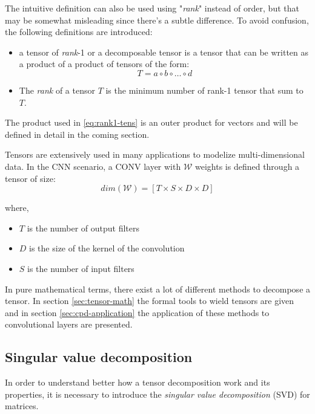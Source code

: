 The intuitive definition can also be used using "\emph{rank}" instead of order, but that may be somewhat misleading since there's a subtle difference. To avoid confusion, the following definitions are introduced: 
\begin{itemize}
  \item a tensor of \emph{rank}-1 or a decomposable tensor  is a tensor that can be written as a product of a product of tensors of the form: 
  \begin{equation}
  \label{eq:rank1-tens}
    T = a \circ b \circ \ldots \circ d  
  \end{equation}   
  
  \item The \emph{rank} of a tensor $T$ is the minimum number of rank-1 tensor that sum to $T$.

\end{itemize}

The product used in \ref{eq:rank1-tens} is an outer product for vectors and will be defined in detail in the coming section. 

Tensors are extensively used in many applications \parencite{WTensor} to modelize multi-dimensional data. In the CNN scenario, a CONV layer with $\mathcal{W}$ weights is defined through a tensor of size: 
\begin{equation}
\label{eq:conv-tensor}
  dim(\mathcal{W})  = [T \times S \times D \times D]
\end{equation}

where, 
\begin{itemize}
 \item $T$ is the number of output filters
 \item $D$ is the size of the kernel of the convolution 
 \item $S$ is the number of input filters 
\end{itemize}

In pure mathematical terms, there exist a lot of different methods to decompose a tensor. In section \ref{sec:tensor-math} the formal tools to wield tensors are given and in section \ref{sec:cpd-application}  the application of these methods to convolutional layers are presented. 

\subsection{Singular value decomposition}
In order to understand better how a tensor decomposition work and its properties, it is necessary to introduce the \emph{singular value decomposition} (SVD) for matrices. 

